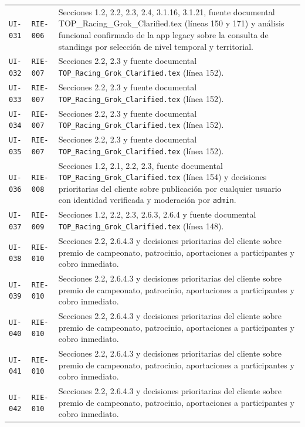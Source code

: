 \documentclass[10pt,letterpaper]{article}
\begin{document}
\begin{landscape}
\begin{longtable}{P{2.7cm}P{2.6cm}P{15.7cm}}
\texttt{UI-031} & \texttt{RIE-006} & Secciones 1.2, 2.2, 2.3, 2.4, 3.1.16, 3.1.21, fuente documental TOP\_Racing\_Grok\_Clarified.tex (líneas 150 y 171) y análisis funcional confirmado de la app legacy sobre la consulta de standings por selección de nivel temporal y territorial.\\
\texttt{UI-032} & \texttt{RIE-007} & Secciones 2.2, 2.3 y fuente documental \texttt{TOP\_Racing\_Grok\_Clarified.tex} (línea 152).\\
\texttt{UI-033} & \texttt{RIE-007} & Secciones 2.2, 2.3 y fuente documental \texttt{TOP\_Racing\_Grok\_Clarified.tex} (línea 152).\\
\texttt{UI-034} & \texttt{RIE-007} & Secciones 2.2, 2.3 y fuente documental \texttt{TOP\_Racing\_Grok\_Clarified.tex} (línea 152).\\
\texttt{UI-035} & \texttt{RIE-007} & Secciones 2.2, 2.3 y fuente documental \texttt{TOP\_Racing\_Grok\_Clarified.tex} (línea 152).\\
\texttt{UI-036} & \texttt{RIE-008} & Secciones 1.2, 2.1, 2.2, 2.3, fuente documental \texttt{TOP\_Racing\_Grok\_Clarified.tex} (línea 154) y decisiones prioritarias del cliente sobre publicación por cualquier usuario con identidad verificada y moderación por \texttt{admin}.\\
\texttt{UI-037} & \texttt{RIE-009} & Secciones 1.2, 2.2, 2.3, 2.6.3, 2.6.4 y fuente documental \texttt{TOP\_Racing\_Grok\_Clarified.tex} (línea 148).\\
\texttt{UI-038} & \texttt{RIE-010} & Secciones 2.2, 2.6.4.3 y decisiones prioritarias del cliente sobre premio de campeonato, patrocinio, aportaciones a participantes y cobro inmediato.\\
\texttt{UI-039} & \texttt{RIE-010} & Secciones 2.2, 2.6.4.3 y decisiones prioritarias del cliente sobre premio de campeonato, patrocinio, aportaciones a participantes y cobro inmediato.\\
\texttt{UI-040} & \texttt{RIE-010} & Secciones 2.2, 2.6.4.3 y decisiones prioritarias del cliente sobre premio de campeonato, patrocinio, aportaciones a participantes y cobro inmediato.\\
\texttt{UI-041} & \texttt{RIE-010} & Secciones 2.2, 2.6.4.3 y decisiones prioritarias del cliente sobre premio de campeonato, patrocinio, aportaciones a participantes y cobro inmediato.\\
\texttt{UI-042} & \texttt{RIE-010} & Secciones 2.2, 2.6.4.3 y decisiones prioritarias del cliente sobre premio de campeonato, patrocinio, aportaciones a participantes y cobro inmediato.\\

\end{longtable}
\end{landscape}
\end{document}
